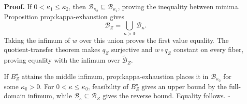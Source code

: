 \textbf{Proof.}
If \(0<\kappa_1\le\kappa_2\), then \(\mathcal B_{\kappa_2}\subseteq\mathcal B_{\kappa_1}\), proving the inequality between minima.  Proposition prop:kappa-exhaustion gives
\[
 \mathcal B_Z=\bigcup_{\kappa>0}\mathcal B_\kappa.
\]
Taking the infimum of \(w\) over this union proves the first value equality.  The quotient-transfer theorem makes \(q_Z\) surjective and \(w\circ q_Z\) constant on every fiber, proving equality with the infimum over \(\widetilde{\mathcal B}_Z\).

If \(B_Z^\star\) attains the middle infimum, prop:kappa-exhaustion places it in \(\mathcal B_{\kappa_0}\) for some \(\kappa_0>0\).  For \(0<\kappa\le\kappa_0\), feasibility of \(B_Z^\star\) gives an upper bound by the full-domain infimum, while \(\mathcal B_\kappa\subseteq\mathcal B_Z\) gives the reverse bound.  Equality follows. \(\square\)